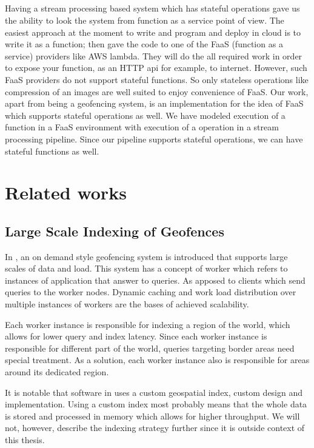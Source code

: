 \documentclass[a4]{report}
\begin{document}
    \paragraph{}
    Having a stream processing based system which has stateful operations gave us the ability to look the system from
    function as a service point of view.
    The easiest approach at the moment to write and program and deploy in cloud is to write it as a function;
    then gave the code to one of the FaaS (function as a service) providers like AWS lambda.
    They will do the all required work in order to expose your function, as an HTTP api for example, to internet.
    However, such FaaS providers do not support stateful functions.
    So only stateless operations like compression of an images are well suited to enjoy convenience of FaaS.
    Our work, apart from being a geofencing system, is an implementation for the idea of FaaS which supports stateful
    operations as well.
    We have modeled execution of a function in a FaaS environment with execution of a operation in a stream
    processing pipeline.
    Since our pipeline supports stateful operations, we can have stateful functions as well.


    \chapter{Related works}


    \section{Large Scale Indexing of Geofences}
    In \cite{Cirillo-Jacobs-Martin-Szczytowski-2014}, an on demand style geofencing system is introduced that
    supports large scales of data and load.
    This system has a concept of worker which refers to instances of application that answer to queries.
    As apposed to clients which send queries to the worker nodes.
    Dynamic caching and work load distribution over multiple instances of workers are the bases of achieved
    scalability.

    Each worker instance is responsible for indexing a region of the world, which allows for lower query and index latency.
    Since each worker instance is responsible for different part of the world, queries targeting border areas need
    special treatment.
    As a solution, each worker instance also is responsible for areas around its dedicated region.

    It is notable that software in \cite{Cirillo-Jacobs-Martin-Szczytowski-2014} uses a custom geospatial index,
    custom design and implementation.
    Using a custom index most probably means that the whole data is stored and processed in memory which allows for
    higher throughput.
    We will not, however, describe the indexing strategy further since it is outside context of this thesis.
\end{document}
